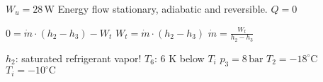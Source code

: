 \( W_u = 28 \, \text{W} \)  
Energy flow stationary, adiabatic and reversible.  
\( Q = 0 \)  

\( 0 = \dot{m} \cdot (h_2 - h_3) - W_t \)  
\( W_t = \dot{m} \cdot (h_2 - h_3) \)  
\( \dot{m} = \frac{W_t}{h_2 - h_3} \)  

\( h_2 \): saturated refrigerant vapor!  
\( T_6 \): 6 K below \( T_i \)  
\( p_3 = 8 \, \text{bar} \)  
\( T_2 = -18^\circ \text{C} \)  
\( T_i = -10^\circ \text{C} \)